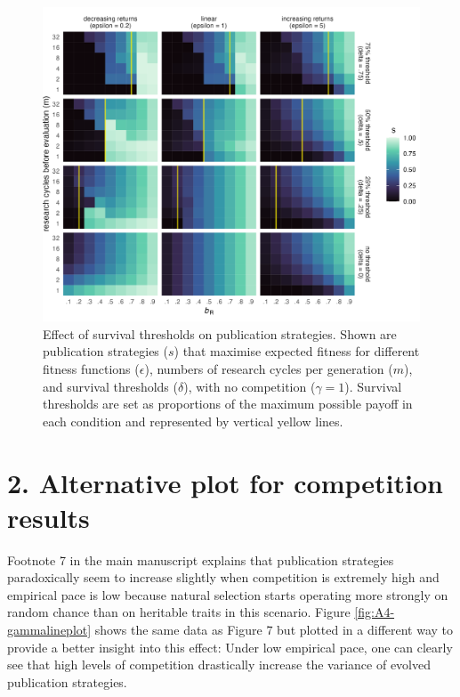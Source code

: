 \documentclass[
]{article}
\begin{document}
\begin{figure}[H]
\includegraphics[width=\textwidth]{../plots/plot_delta_tile_EF} \caption{Effect of survival thresholds on publication strategies. Shown are publication strategies ($s$) that maximise expected fitness for different fitness functions ($\epsilon$), numbers of research cycles per generation ($m$), and survival thresholds ($\delta$), with no competition ($\gamma = 1$). Survival thresholds are set as proportions of the maximum possible payoff in each condition and represented by vertical yellow lines.}\label{fig:A3-deltaplot}
\end{figure}

\hypertarget{alternative-plot-for-competition-results}{%
\section{2. Alternative plot for competition results}\label{alternative-plot-for-competition-results}}

Footnote 7 in the main manuscript explains that publication strategies paradoxically seem to increase slightly when competition is extremely high and empirical pace is low because natural selection starts operating more strongly on random chance than on heritable traits in this scenario.
Figure \ref{fig:A4-gammalineplot} shows the same data as Figure 7 but plotted in a different way to provide a better insight into this effect:
Under low empirical pace, one can clearly see that high levels of competition drastically increase the variance of evolved publication strategies.
\end{document}
